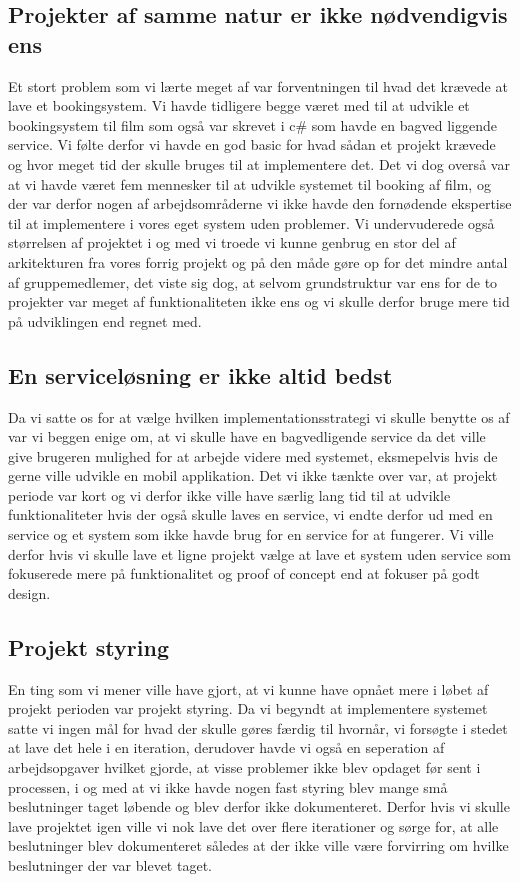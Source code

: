 \subsection{Projekter af samme natur er ikke nødvendigvis ens}
\label{Konklusion_Lessons_Projekt}
Et stort problem som vi lærte meget af var forventningen til hvad det krævede at lave et bookingsystem. Vi havde tidligere begge været med til at udvikle et bookingsystem til film som også var skrevet i c\# som havde en bagved liggende service. Vi følte derfor vi havde en god basic for hvad sådan et projekt krævede og hvor meget tid der skulle bruges til at implementere det. Det vi dog overså var at vi havde været fem mennesker til at udvikle systemet til booking af film, og der var derfor nogen af arbejdsområderne vi ikke havde den fornødende ekspertise til at implementere i vores eget system uden problemer. Vi undervuderede også størrelsen af projektet i og med vi troede vi kunne genbrug en stor del af arkitekturen fra vores forrig projekt og på den måde gøre op for det mindre antal af gruppemedlemer, det viste sig dog, at selvom grundstruktur var ens for de to projekter var meget af funktionaliteten ikke ens og vi skulle derfor bruge mere tid på udviklingen end regnet med.

\subsection{En serviceløsning er ikke altid bedst}
\label{Konklusion_Lessons_Service}
Da vi satte os for at vælge hvilken implementationsstrategi vi skulle benytte os af var vi beggen enige om, at vi skulle have en bagvedligende service da det ville give brugeren mulighed for at arbejde videre med systemet, eksmepelvis hvis de gerne ville udvikle en mobil applikation. Det vi ikke tænkte over var, at projekt periode var kort og vi derfor ikke ville have særlig lang tid til at udvikle funktionaliteter hvis der også skulle laves en service, vi endte derfor ud med en service og et system som ikke havde brug for en service for at fungerer.
Vi ville derfor hvis vi skulle lave et ligne projekt vælge at lave et system uden service som fokuserede mere på funktionalitet og proof of concept end at fokuser på godt design.

\subsection{Projekt styring}
\label{Konklusion_Lessons_Styring}
En ting som vi mener ville have gjort, at vi kunne have opnået mere i løbet af projekt perioden var projekt styring. Da vi begyndt at implementere systemet satte vi ingen mål for hvad der skulle gøres færdig til hvornår, vi forsøgte i stedet at lave det hele i en iteration, derudover havde vi også en seperation af arbejdsopgaver hvilket gjorde, at visse problemer ikke blev opdaget før sent i processen, i og med at vi ikke havde nogen fast styring blev mange små beslutninger taget løbende og blev derfor ikke dokumenteret. Derfor hvis vi skulle lave projektet igen ville vi nok lave det over flere iterationer og sørge for, at alle beslutninger blev dokumenteret således at der ikke ville være forvirring om hvilke beslutninger der var blevet taget.   
